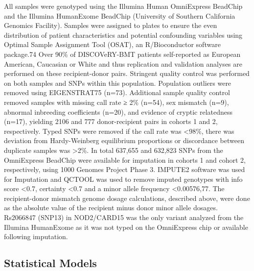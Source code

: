\documentclass[]{DissertateUSU}
\begin{document}
All samples were genotyped using the Illumina Human OmniExpress BeadChip
and the Illumina HumanExome BeadChip (University of Southern California
Genomics Facility). Samples were assigned to plates to ensure the even
distribution of patient characteristics and potential confounding
variables using Optimal Sample Assignment Tool (OSAT), an R/Bioconductor
software package.74 Over 90\% of DISCOVeRY-BMT patients self-reported as
European American, Caucasian or White and thus replication and
validation analyses are performed on these recipient-donor pairs.
Stringent quality control was performed on both samples and SNPs within
this population. Population outliers were removed using EIGENSTRAT75
(n=73). Additional sample quality control removed samples with missing
call rate ≥ 2\% (n=54), sex mismatch (n=9), abnormal inbreeding
coefficients (n=20), and evidence of cryptic relatedness (n=17),
yielding 2106 and 777 donor-recipient pairs in cohorts 1 and 2,
respectively. Typed SNPs were removed if the call rate was
\textless{}98\%, there was deviation from Hardy-Weinberg equilibrium
proportions or discordance between duplicate samples was
\textgreater{}2\%. In total 637,655 and 632,823 SNPs from the
OmniExpress BeadChip were available for imputation in cohorts 1 and
cohort 2, respectively, using 1000 Genomes Project Phase 3. IMPUTE2
software was used for Imputation and QCTOOL was used to remove imputed
genotypes with info score \textless{}0.7, certainty \textless{}0.7 and a
minor allele frequency \textless{}0.00576,77. The recipient-donor
mismatch genome dosage calculations, described above, were done as the
absolute value of the recipient minus donor minor allele dosages.
Rs2066847 (SNP13) in NOD2/CARD15 was the only variant analyzed from the
Illumina HumanExome as it was not typed on the OmniExpress chip or
available following imputation.

\subsection{Statistical Models}\label{statistical-models}
\end{document}
